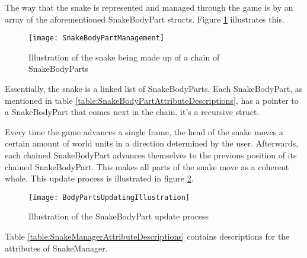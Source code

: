 The way that the snake is represented and managed through the game is by an array of the aforementioned SnakeBodyPart structs. Figure \ref{SnakeBodyPartManagement} illustrates this.

\begin{figure}[H]
	\texttt{[image: SnakeBodyPartManagement]}
	\centering
	\caption{Illustration of the snake being made up of a chain of SnakeBodyParts}
	\label{SnakeBodyPartManagement}
\end{figure} 

Essentially, the snake is a linked list \cite{LinkedLists} of SnakeBodyParts. Each SnakeBodyPart, as mentioned in table \ref{table:SnakeBodyPartAttributeDescriptions}, has a pointer to a SnakeBodyPart that comes next in the chain. it's a recursive struct.

Every time the game advances a single frame, the head of the snake moves a certain amount of world units in a direction determined by the user. Afterwards, each chained SnakeBodyPart advances themselves to the previous position of its chained SnakeBodyPart. This makes all parts of the snake move as a coherent whole. This update process is illustrated in figure \ref{SnakeBodyPartUpdateProcess}.

\begin{figure}[H]
	\texttt{[image: BodyPartsUpdatingIllustration]}
	\centering
	\caption{Illustration of the SnakeBodyPart update process}
	\label{SnakeBodyPartUpdateProcess}
\end{figure} 

Table \ref{table:SnakeManagerAttributeDescriptions} contains descriptions for the attributes of SnakeManager.

